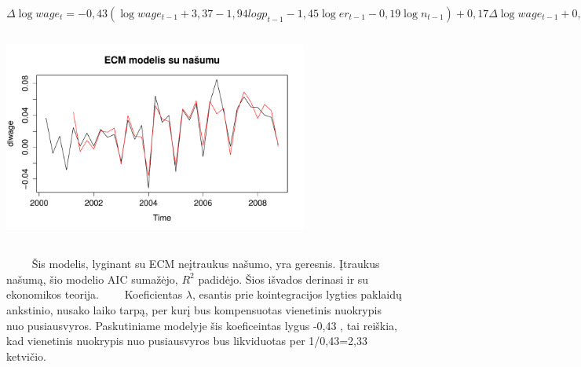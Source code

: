 \documentclass[12pt,a4paper]{article}
\theoremstyle{change}\newtheorem{salyga}{Uždavinys}
\begin{document}
\begin{center}
\large$ \Delta \log wage_t =  -0,43 (\log wage_{t-1}+3,37 - 1,94log p_{t-1} - 1,45\log er_{t-1} - 0,19\log n_{t-1})  + 0,17\Delta \log wage_{t-1}+0,08\Delta \log wage_{t-2}-0,01\Delta \log wage_{t-3} + 0,60\Delta \log wage_{t-4}+1,86 \Delta \log p_{t}-0,86 \Delta \log p_{t-1}+0,14\Delta \log p_{t-2}+0,55\Delta \log p_{t-3} -1,67 \Delta \log p_{t-4}+0,76 \Delta \log er_{t} + \varepsilon_t$  
\end{center}     
 
  \begin{center}
\includegraphics[width=100mm,height=70mm]{ecm23}

\end{center}        
\vskip 8pt
$\qquad$ Šis modelis, lyginant su ECM neįtraukus našumo, yra geresnis. Įtraukus našumą, šio modelio AIC sumažėjo, $ R^2 $  padidėjo. Šios išvados derinasi ir su ekonomikos teorija. 
\vskip 8pt
$\qquad$Koeficientas $ \lambda $, esantis prie kointegracijos lygties paklaidų ankstinio, nusako laiko tarpą, per kurį bus kompensuotas vienetinis nuokrypis nuo pusiausvyros. Paskutiniame modelyje šis koeficeintas lygus -0,43 , tai reiškia, kad vienetinis nuokrypis nuo pusiausvyros bus likviduotas per 1/0,43=2,33 ketvičio. 
\vskip 8pt




\pagebreak
\end{document}
